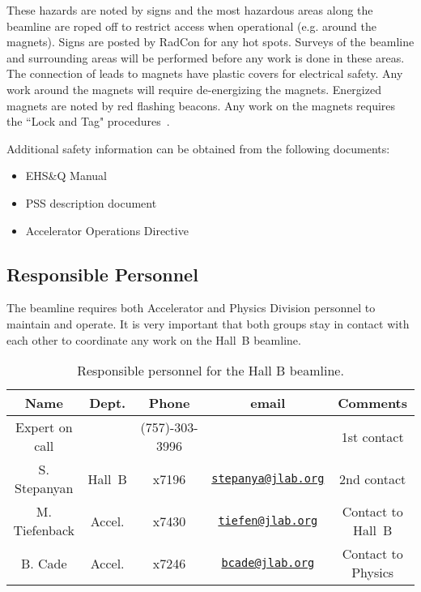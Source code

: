 These hazards are noted by signs and the most hazardous areas along the beamline are 
roped off to restrict access when operational (e.g. around the magnets). Signs are posted 
by RadCon for any hot spots. Surveys of the beamline and surrounding areas will be 
performed before any work is done in these areas. The connection of leads to magnets have 
plastic covers for electrical safety. Any work around the magnets will require 
de-energizing the magnets. Energized magnets are noted by red flashing beacons. Any work 
on the magnets requires the ``Lock and Tag" procedures~\cite{ehs}.  

Additional safety information can be obtained from the following documents:
\begin{itemize}[label=$\circ$]

\item EHS\&Q Manual~\cite{ehs} 

\item PSS description document~\cite{pss}

\item Accelerator Operations Directive~\cite{ops}

\end{itemize} 

\subsection{Responsible Personnel}

The beamline requires both Accelerator and Physics Division personnel to maintain and 
operate. It is very important that both groups stay in contact with each other to 
coordinate any work on the Hall~B beamline. 

\begin{table}[!ht]
\centering
\begin{tabular}{|c|c|c|c|c|} \hline
 Name&Dept.&Phone&email&Comments \\ \hline
Expert on call& &(757)-303-3996&& 1st contact \\ \hline
S. Stepanyan  & Hall~B&x7196&\href{mailto:stepanya@jlab.org}{\nolinkurl{stepanya@jlab.org}}&2nd contact \\ \hline
M. Tiefenback & Accel.&x7430&\href{mailto:tiefen@jlab.org}{\nolinkurl{tiefen@jlab.org}}& Contact to Hall~B \\ \hline
B. Cade       & Accel.&x7246&\href{mailto:bcade@jlab.org}{\nolinkurl{bcade@jlab.org}}&Contact to Physics \\ \hline
\end{tabular}
\caption{Responsible personnel for the Hall B beamline.} 
\label{tb:beam}
\end{table}

